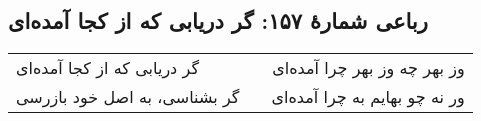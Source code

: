 \begin{center}
\section*{رباعی شمارهٔ ۱۵۷: گر دریابی که از کجا آمده‌ای}
\label{sec:157}
\begin{longtable}{l p{0.5cm} r}
گر دریابی که از کجا آمده‌ای
&&
وز بهر چه  وز بهر چرا آمده‌ای
\\
گر بشناسی، به اصل خود بازرسی
&&
ور نه چو بهایم به چرا آمده‌ای
\\
\end{longtable}
\end{center}
